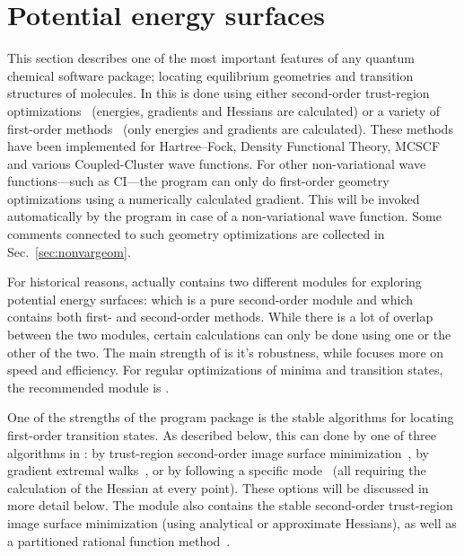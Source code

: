 \chapter{Potential energy surfaces}\label{ch:geometrywalks}

This section describes one of the most important features of any
quantum chemical software package; locating equilibrium
geometries and
transition structures of molecules. In
{\dalton} this is done using either second-order trust-region
optimizations~\cite{tuhjahjajpjjcp84} (energies, gradients and
Hessians are calculated) or a variety of first-order
methods~\cite{Fletcher} (only energies and gradients are
calculated). These methods
have been implemented for Hartree--Fock, Density Functional Theory,
MCSCF  and various Coupled-Cluster wave functions. For other
non-variational wave functions---such as CI---the program can 
only do first-order geometry optimizations using a
numerically
calculated gradient. This will be invoked automatically by the program
in case of a non-variational wave function. Some comments connected to
such geometry optimizations are collected in Sec.~\ref{sec:nonvargeom}.

For historical reasons, {\dalton} actually contains two different
modules for exploring potential energy surfaces:
 which is
a pure second-order module and  which contains both
first- and second-order methods. While there is a lot of overlap
between the two modules, certain calculations can only be done using
one or the other of the two. The main strength of  is it's
robustness, while  focuses more on speed and
efficiency. For regular optimizations of minima and transition states,
the recommended module is .

One of the strengths of the {\dalton} program package is the
stable algorithms for locating first-order transition states.
As described below, this can done by one of three algorithms in
: by trust-region second-order image surface
minimization~\cite{thcpl182},
by gradient extremal walks~\cite{pjhjajthtca73},
or by following a specific mode~\cite{hjajpjthjcp85} (all
requiring the calculation of the Hessian at every point). These
options will be discussed in more detail below. The 
module also contains the stable second-order trust-region image
surface minimization (using analytical or approximate Hessians), as
well as a partitioned rational function method~\cite{abnajsrsjpc89}.

